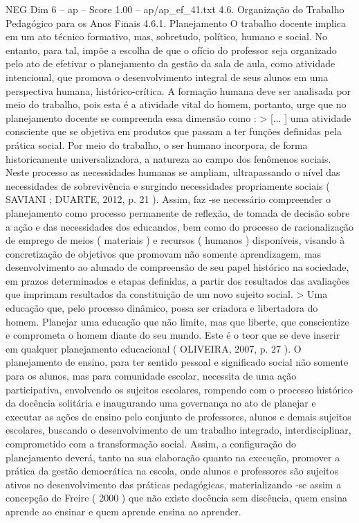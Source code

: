 \begin{textsample}{NEG Dim 6 – ap – Score 1.00 – ap/ap\_ef\_41.txt}  \label{ex:f6_neg_190}
4.6.
Organização do Trabalho Pedagógico para os Anos Finais 4.6.1.
Planejamento O trabalho docente implica em um ato técnico formativo, mas, sobretudo, político, humano e social.
No entanto, para tal, impõe a escolha de que o ofício do professor seja organizado pelo ato de efetivar o planejamento da gestão da sala de aula, como atividade intencional, que promova o desenvolvimento integral de seus alunos em uma perspectiva humana, histórico-crítica.
A formação humana deve ser analisada por meio do trabalho, pois esta é a atividade vital do homem, portanto, urge que no planejamento docente se compreenda essa dimensão como : > [... ] uma atividade consciente que se objetiva em produtos que passam a ter funções definidas pela prática social.
Por meio do trabalho, o ser humano incorpora, de forma historicamente universalizadora, a natureza ao campo dos fenômenos sociais.
Neste processo as necessidades humanas se ampliam, ultrapassando o nível das necessidades de sobrevivência e surgindo necessidades propriamente sociais ( SAVIANI ; DUARTE, 2012, p. 21 ).
Assim, faz -se necessário compreender o planejamento como processo permanente de reflexão, de tomada de decisão sobre a ação e das necessidades dos educandos, bem como do processo de racionalização de emprego de meios ( materiais ) e recursos ( humanos ) disponíveis, visando à concretização de objetivos que promovam não somente aprendizagem, mas desenvolvimento ao alunado de compreensão de seu papel histórico na sociedade, em prazos determinados e etapas definidas, a partir dos resultados das avaliações que imprimam resultados da constituição de um novo sujeito social. > Uma educação que, pelo processo dinâmico, possa ser criadora e libertadora do homem.
Planejar uma educação que não limite, mas que liberte, que conscientize e comprometa o homem diante do seu mundo.
Este é o teor que se deve inserir em qualquer planejamento educacional ( OLIVEIRA, 2007, p. 27 ).
O planejamento de ensino, para ter sentido pessoal e significado social não somente para os alunos, mas para comunidade escolar, necessita de uma ação participativa, envolvendo os sujeitos escolares, rompendo com o processo histórico da docência solitária e inaugurando uma governança no ato de planejar e executar as ações de ensino pelo conjunto de professores, alunos e demais sujeitos escolares, buscando o desenvolvimento de um trabalho integrado, interdisciplinar, comprometido com a transformação social.
Assim, a configuração do planejamento deverá, tanto na sua elaboração quanto na execução, promover a prática da gestão democrática na escola, onde alunos e professores são sujeitos ativos no desenvolvimento das práticas pedagógicas, materializando -se assim a concepção de Freire ( 2000 ) que não existe docência sem discência, quem ensina aprende ao ensinar e quem aprende ensina ao aprender.

\end{textsample}
